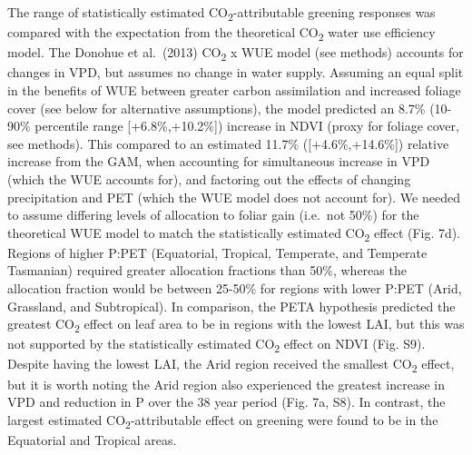 \documentclass[gc, manuscript]{copernicus}
\begin{document}
The range of statistically estimated CO\textsubscript{2}-attributable
greening responses was compared with the expectation from the
theoretical CO\textsubscript{2} water use efficiency model. The Donohue
et al.~(2013) CO\textsubscript{2} x WUE model (see methods) accounts for
changes in VPD, but assumes no change in water supply. Assuming an equal
split in the benefits of WUE between greater carbon assimilation and
increased foliage cover (see below for alternative assumptions), the
model predicted an 8.7\% (10-90\% percentile range {[}+6.8\%,+10.2\%{]})
increase in NDVI (proxy for foliage cover, see methods). This compared
to an estimated 11.7\% ({[}+4.6\%,+14.6\%{]}) relative increase from the
GAM, when accounting for simultaneous increase in VPD (which the WUE
accounts for), and factoring out the effects of changing precipitation
and PET (which the WUE model does not account for). We needed to assume
differing levels of allocation to foliar gain (i.e.~not 50\%) for the
theoretical WUE model to match the statistically estimated
CO\textsubscript{2} effect (Fig. 7d). Regions of higher P:PET
(Equatorial, Tropical, Temperate, and Temperate Tasmanian) required
greater allocation fractions than 50\%, whereas the allocation fraction
would be between 25-50\% for regions with lower P:PET (Arid, Grassland,
and Subtropical). In comparison, the PETA hypothesis
\citep{donohue_etal17} predicted the greatest CO\textsubscript{2} effect
on leaf area to be in regions with the lowest LAI, but this was not
supported by the statistically estimated CO\textsubscript{2} effect on
NDVI (Fig. S9). Despite having the lowest LAI, the Arid region received
the smallest CO\textsubscript{2} effect, but it is worth noting the Arid
region also experienced the greatest increase in VPD and reduction in P
over the 38 year period (Fig. 7a, S8). In contrast, the largest
estimated CO\textsubscript{2}-attributable effect on greening were found
to be in the Equatorial and Tropical areas.
\end{document}
